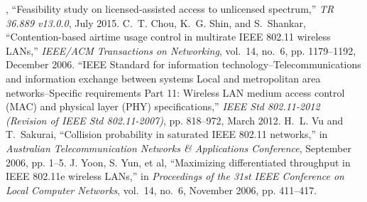 %

\begin{thebibliography}{99.}%
	, ``Feasibility study on licensed-assisted access to unlicensed spectrum,'' \emph{{TR 36.889 v13.0.0}}, July 2015.
	 C.~T. Chou, K.~G. Shin, and S.~Shankar, ``{Contention-based airtime usage control in multirate IEEE 802.11 wireless LANs},'' \emph{{IEEE/ACM Transactions on Networking}}, vol.~14, no.~6, pp. 1179--1192, December 2006.	
	``{IEEE Standard for information technology--Telecommunications and information exchange between systems Local and metropolitan area networks--Specific requirements Part 11: Wireless LAN medium access control (MAC) and physical layer (PHY) specifications},'' \emph{{IEEE Std 802.11-2012 (Revision of IEEE Std 802.11-2007)}}, pp. 818--972, March 2012.	
	 H.~L. Vu and T.~Sakurai, ``{Collision probability in saturated IEEE 802.11 networks},'' in \emph{{Australian Telecommunication Networks \& Applications Conference}}, September 2006, pp. 1--5.
	 {J. Yoon, S. Yun, et al}, ``{Maximizing differentiated throughput in IEEE 802.11e wireless LANs},'' in \emph{{ Proceedings of the 31st IEEE Conference on Local Computer Networks}}, vol.~14, no.~6, November 2006, pp. 411--417.
\end{thebibliography}


